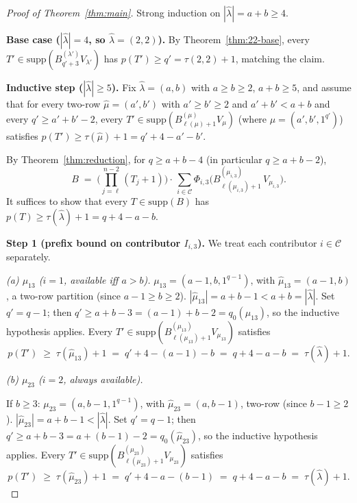 \documentclass[11pt]{article}
\theoremstyle{definition}
\newcommand{\hatl}{\widehat\lambda}
\newcommand{\hatm}{\widehat\mu}
\newcommand{\supp}{\mathrm{supp}}
\begin{document}
\begin{proof}[Proof of Theorem~\ref{thm:main}]
Strong induction on $|\hatl| = a + b \ge 4$.

\medskip\textbf{Base case ($|\hatl| = 4$, so $\hatl = (2, 2)$).}
By Theorem~\ref{thm:22-base}, every $T' \in \supp(B^{(\lambda')}_{q'+3}
V_{\lambda'})$ has $p(T') \ge q' = \tau(2, 2) + 1$, matching the
claim.

\medskip\textbf{Inductive step ($|\hatl| \ge 5$).}
Fix $\hatl = (a, b)$ with $a \ge b \ge 2$, $a + b \ge 5$, and assume
that for every two-row $\hatm = (a', b')$ with $a' \ge b' \ge 2$ and
$a' + b' < a + b$ and every $q' \ge a' + b' - 2$, every
$T' \in \supp(B^{(\mu)}_{\ell(\mu)+1} V_\mu)$ (where $\mu =
(a', b', 1^{q'})$) satisfies $p(T') \ge \tau(\hatm) + 1 = q' + 4 - a' - b'$.

By Theorem~\ref{thm:reduction}, for $q \ge a + b - 4$ (in particular
$q \ge a + b - 2$),
\[
   B \;=\; \biggl(\prod_{j=\ell}^{n-2}(T_j + 1)\biggr)
   \cdot\, \sum_{i \in \mathcal{C}}
   \Phi_{i,3}\bigl(B^{(\mu_{i,3})}_{\ell(\mu_{i,3})+1}\,V_{\mu_{i,3}}\bigr).
\]
It suffices to show that every $T \in \supp(B)$ has
$p(T) \ge \tau(\hatl) + 1 = q + 4 - a - b$.

\medskip\textbf{Step 1 (prefix bound on contributor $I_{i,3}$).}
We treat each contributor $i \in \mathcal{C}$ separately.

\smallskip\emph{(a) $\mu_{13}$ ($i = 1$, available iff $a > b$).}
$\mu_{13} = (a-1, b, 1^{q-1})$, with $\hatm_{13} = (a-1, b)$, a
two-row partition (since $a - 1 \ge b \ge 2$).  $|\hatm_{13}| =
a + b - 1 < a + b = |\hatl|$.  Set $q' = q - 1$; then $q' \ge
a + b - 3 = (a-1) + b - 2 = q_0(\hatm_{13})$, so the inductive
hypothesis applies.  Every $T' \in \supp(B^{(\mu_{13})}_{\ell(\mu_{13})+1}
V_{\mu_{13}})$ satisfies
\[
   p(T') \;\ge\; \tau(\hatm_{13}) + 1 \;=\; q' + 4 - (a-1) - b \;=\;
   q + 4 - a - b \;=\; \tau(\hatl) + 1.
\]

\smallskip\emph{(b) $\mu_{23}$ ($i = 2$, always available).}

\textbullet\quad If $b \ge 3$: $\mu_{23} = (a, b-1, 1^{q-1})$, with
$\hatm_{23} = (a, b-1)$, two-row (since $b - 1 \ge 2$).
$|\hatm_{23}| = a + b - 1 < |\hatl|$.  Set $q' = q - 1$; then
$q' \ge a + b - 3 = a + (b - 1) - 2 = q_0(\hatm_{23})$, so the inductive
hypothesis applies.  Every $T' \in \supp(B^{(\mu_{23})}_{\ell(\mu_{23})+1}
V_{\mu_{23}})$ satisfies
\[
   p(T') \;\ge\; \tau(\hatm_{23}) + 1 \;=\; q' + 4 - a - (b - 1) \;=\;
   q + 4 - a - b \;=\; \tau(\hatl) + 1.
\]


\end{proof}
\end{document}
